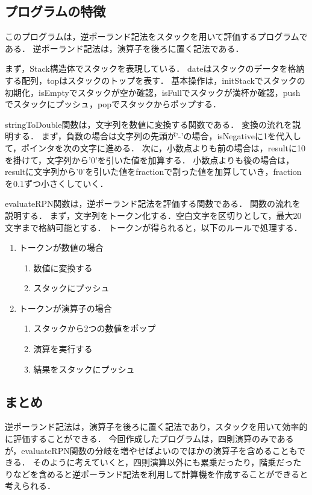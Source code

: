 \documentclass{ltjsarticle}
\begin{document}
\subsection{プログラムの特徴}
このプログラムは，逆ポーランド記法をスタックを用いて評価するプログラムである．
逆ポーランド記法は，演算子を後ろに置く記法である．

まず，Stack構造体でスタックを表現している．
dateはスタックのデータを格納する配列，topはスタックのトップを表す．
基本操作は，initStackでスタックの初期化，isEmptyでスタックが空か確認，isFullでスタックが満杯か確認，pushでスタックにプッシュ，popでスタックからポップする．

stringToDouble関数は，文字列を数値に変換する関数である．
変換の流れを説明する．
まず，負数の場合は文字列の先頭が'-'の場合，isNegativeに1を代入して，ポインタを次の文字に進める．
次に，小数点よりも前の場合は，resultに10を掛けて，文字列から'0'を引いた値を加算する．
小数点よりも後の場合は，resultに文字列から'0'を引いた値をfractionで割った値を加算していき，fractionを0.1ずつ小さくしていく．

evaluateRPN関数は，逆ポーランド記法を評価する関数である．
関数の流れを説明する．
まず，文字列をトークン化する．空白文字を区切りとして，最大20文字まで格納可能とする．
トークンが得られると，以下のルールで処理する．
\begin{enumerate}
    \item トークンが数値の場合
    \begin{enumerate}
        \item 数値に変換する
        \item スタックにプッシュ
    \end{enumerate}
    \item トークンが演算子の場合
    \begin{enumerate}
        \item スタックから2つの数値をポップ
        \item 演算を実行する
        \item 結果をスタックにプッシュ
    \end{enumerate}
\end{enumerate}

\subsection{まとめ}
逆ポーランド記法は，演算子を後ろに置く記法であり，スタックを用いて効率的に評価することができる．
今回作成したプログラムは，四則演算のみであるが，evaluateRPN関数の分岐を増やせばよいのでほかの演算子を含めることもできる．
そのように考えていくと，四則演算以外にも累乗だったり，階乗だったりなどを含めると逆ポーランド記法を利用して計算機を作成することができると考えられる．
\end{document}
